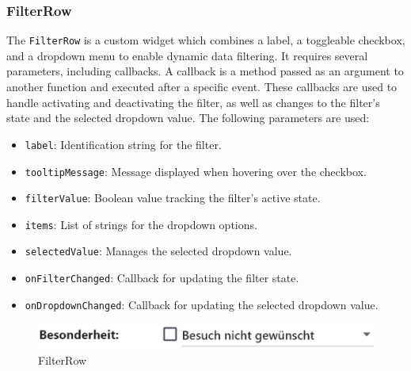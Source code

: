 \subsubsection{FilterRow}
\label{fig:FilterRow}

The \texttt{FilterRow} is a custom widget which combines a label, a toggleable checkbox, and a dropdown menu to enable dynamic data filtering. It requires several parameters, including callbacks. A callback is a method passed as an argument to another function and executed after a specific event. These callbacks are used to handle activating and deactivating the filter, as well as changes to the filter's state and the selected dropdown value. The following parameters are used:

\begin{itemize}
    \item \texttt{label}: Identification string for the filter.
    \item \texttt{tooltipMessage}: Message displayed when hovering over the checkbox.
    \item \texttt{filterValue}: Boolean value tracking the filter's active state.
    \item \texttt{items}: List of strings for the dropdown options.
    \item \texttt{selectedValue}: Manages the selected dropdown value.
    \item \texttt{onFilterChanged}: Callback for updating the filter state.
    \item \texttt{onDropdownChanged}: Callback for updating the selected dropdown value.
\end{itemize}


\begin{figure}[H]
    \centering
    \includegraphics[width=0.5\linewidth]{images/AdminPanel/FilterRow.png}
    \caption{FilterRow}
\end{figure}

